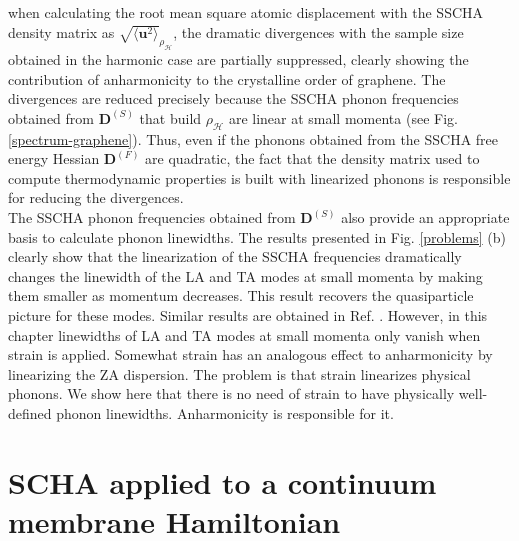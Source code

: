when calculating the root mean square atomic displacement with the SSCHA density matrix as 
$\sqrt{\langle \mathbf{u}^2 \rangle}_{\rho_{\mathcal{H}}}$, the dramatic divergences with the sample size obtained 
in the harmonic case are partially suppressed, clearly showing the contribution of anharmonicity to the crystalline 
order of graphene. The divergences are reduced precisely because the SSCHA phonon frequencies obtained from 
$\boldsymbol{D}^{(S)}$ that build $\rho_{\mathcal{H}}$ are linear at small momenta (see 
Fig. \ref{spectrum-graphene}). Thus, even if the phonons obtained from the SSCHA free energy Hessian 
$\boldsymbol{D}^{(F)}$ are quadratic, the fact that the density matrix used to compute thermodynamic properties is 
built with linearized phonons is responsible for reducing the divergences. \\

The SSCHA phonon frequencies obtained from $\boldsymbol{D}^{(S)}$ also provide an appropriate basis to calculate 
phonon linewidths\cite{bianco2017second,aseginolaza2019phonon}. The results presented in Fig. \ref{problems} (b) 
clearly show that the linearization of the SSCHA frequencies dramatically changes the linewidth of the LA and TA 
modes at small momenta by making them smaller as momentum decreases. This result recovers the quasiparticle picture 
for these modes. Similar results are obtained in Ref. \cite{bonini2012acoustic}. However, in this chapter linewidths 
of LA and TA modes at small momenta only vanish when strain is applied. Somewhat strain has an analogous effect to 
anharmonicity by linearizing the ZA dispersion. The problem is that strain linearizes physical phonons. We show here 
that there is no need of strain to have physically well-defined phonon linewidths. Anharmonicity is responsible for 
it. 

\section{SCHA applied to a continuum membrane Hamiltonian}

